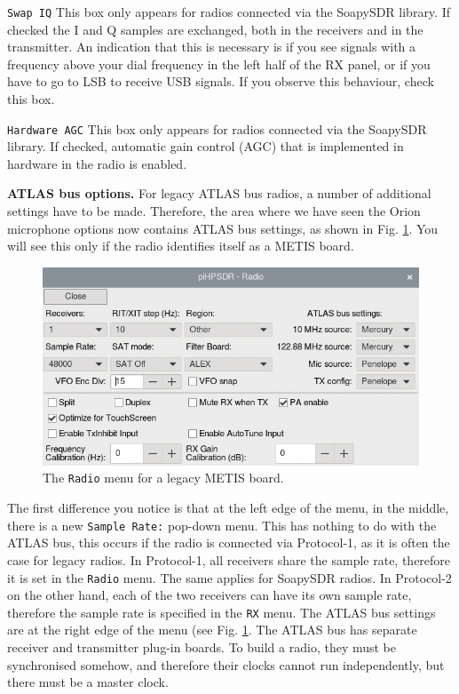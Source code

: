 \documentclass[12pt]{book}
\def\rett#1{\texttt{\color{red}#1}}
\def\bltt#1{\texttt{\color{blue}#1}}
\begin{document}
\rett{Swap IQ} This box only appears for radios connected via the SoapySDR library. If checked
the I and Q samples are exchanged, both in the receivers and in the transmitter. An indication
that this is necessary is if you see signals with a frequency above your dial frequency in
the left half of the RX panel, or if you have to go to LSB to receive USB signals. If you
observe this behaviour, check this box.

\rett{Hardware AGC} This box only appears for radios connected via the SoapySDR library.
If checked, automatic gain control (AGC) that is implemented in hardware in the radio is enabled.

\textbf{ATLAS bus options.} For legacy ATLAS bus radios, a number of additional settings have to be
made. Therefore, the area where we have seen the Orion microphone options now contains ATLAS bus
settings, as shown in Fig. \ref{fig:RadioMenuMetis}. You will see this only if the radio identifies
itself as a METIS board.

\begin{figure}[ht]
\center
\includegraphics[scale=0.45]{RadioMenuMetis.png}
\caption{The \bltt{Radio} menu for a legacy METIS board.}
\label{fig:RadioMenuMetis}
\end{figure}

The first difference you notice is that at the left edge of the menu, in the middle,
there is a new \rett{Sample Rate:} pop-down menu. This has nothing to do with the
ATLAS bus, this occurs if the radio is connected via Protocol-1, as it is often the case for
legacy radios. In Protocol-1, all receivers share the sample rate, therefore it is set in the
\bltt{Radio} menu. The same applies for SoapySDR radios. In Protocol-2 on the other hand, each
of the two receivers can have its own sample rate, therefore the sample rate is specified
in the \bltt{RX} menu. The ATLAS bus settings are at the right edge of the menu (see Fig.
\ref{fig:RadioMenuMetis}. The ATLAS bus has separate receiver and transmitter plug-in boards.
To build a radio, they must be synchronised somehow, and therefore their clocks cannot run
independently, but there must be a master clock.
\end{document}
